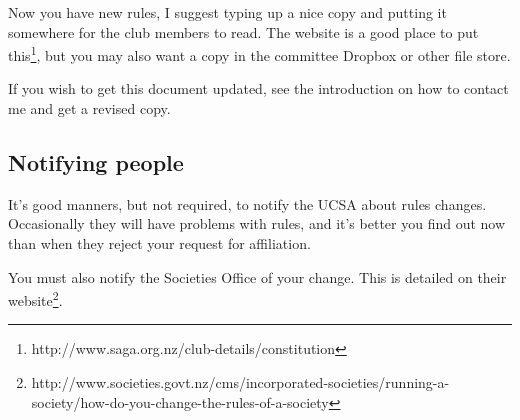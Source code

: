 Now you have new rules, I suggest typing up a nice copy and putting it somewhere for the club members to read. The website is a good place to put this\footnote{http://www.saga.org.nz/club-details/constitution}, but you may also want a copy in the committee Dropbox or other file store.

If you wish to get this document updated, see the introduction on how to contact me and get a revised copy.

\subsection{Notifying people}

It's good manners, but not required, to notify the UCSA about rules changes. Occasionally they will have problems with rules, and it's better you find out now than when they reject your request for affiliation.

You must also notify the Societies Office of your change. This is detailed on their website\footnote{http://www.societies.govt.nz/cms/incorporated-societies/running-a-society/how-do-you-change-the-rules-of-a-society}.